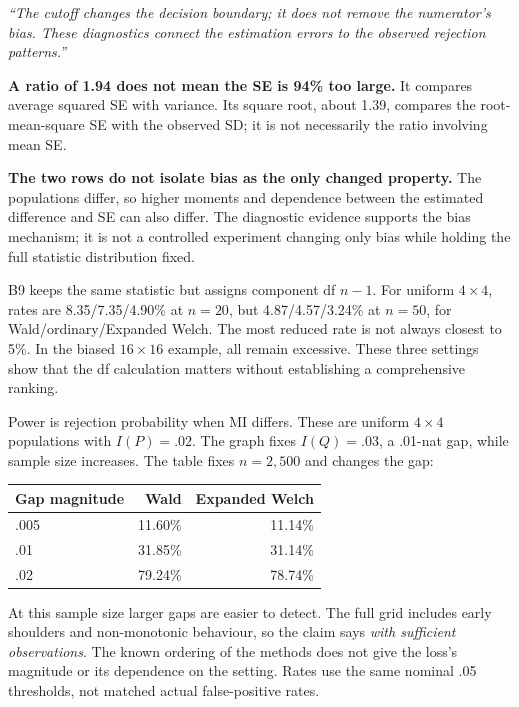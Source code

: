 \emph{``The cutoff changes the decision boundary; it does not remove the numerator's bias. These diagnostics connect the estimation errors to the observed rejection patterns.''}

\textbf{A ratio of 1.94 does not mean the SE is 94\% too large.} It compares average squared SE with variance. Its square root, about 1.39, compares the root-mean-square SE with the observed SD; it is not necessarily the ratio involving mean SE.

\textbf{The two rows do not isolate bias as the only changed property.} The populations differ, so higher moments and dependence between the estimated difference and SE can also differ. The diagnostic evidence supports the bias mechanism; it is not a controlled experiment changing only bias while holding the full statistic distribution fixed.

B9 keeps the same statistic but assigns component df \(n-1\). For uniform \(4\times4\), rates are 8.35/7.35/4.90\% at \(n=20\), but 4.87/4.57/3.24\% at \(n=50\), for Wald/ordinary/Expanded Welch. The most reduced rate is not always closest to 5\%. In the biased \(16\times16\) example, all remain excessive. These three settings show that the df calculation matters without establishing a comprehensive ranking.

\newpage
{}

Power is rejection probability when MI differs. These are uniform \(4\times4\) populations with \(I(P)=.02\). The graph fixes \(I(Q)=.03\), a .01-nat gap, while sample size increases. The table fixes \(n=2{,}500\) and changes the gap:
\begin{center}
\begin{tabular}{@{}lrr@{}}
\toprule
\textbf{Gap magnitude} & \textbf{Wald} & \textbf{Expanded Welch}\\
\midrule
.005 & 11.60\% & 11.14\%\\
.01 & 31.85\% & 31.14\%\\
.02 & 79.24\% & 78.74\%\\
\bottomrule
\end{tabular}
\end{center}
At this sample size larger gaps are easier to detect. The full grid includes early shoulders and non-monotonic behaviour, so the claim says \emph{with sufficient observations}. The known ordering of the methods does not give the loss's magnitude or its dependence on the setting. Rates use the same nominal .05 thresholds, not matched actual false-positive rates.

